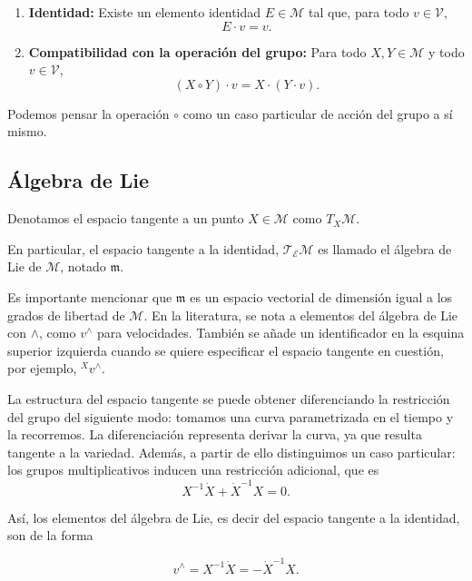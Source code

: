 \begin{enumerate}
\item \textbf{Identidad:}  
Existe un elemento identidad $E \in \mathcal{M}$ tal que, para todo $v \in \mathcal{V}$,
\[
E \cdot v = v.
\]

\item \textbf{Compatibilidad con la operación del grupo:}  
Para todo $X, Y \in \mathcal{M}$ y todo $v \in \mathcal{V}$,
\[
(X \circ Y) \cdot v
=
X \cdot (Y \cdot v).
\]
\end{enumerate}

Podemos pensar la operación $\circ$ como un caso particular de acción del grupo a sí mismo.



\subsection{Álgebra de Lie}

Denotamos el espacio tangente a un punto $X \in \mathcal{M}$ como $T_{X} \mathcal{M}$.

En particular, el espacio tangente a la identidad, $\mathcal{T_E M}$ es llamado el álgebra de Lie de $\mathcal{M}$, notado $\mathfrak{m}$.

Es importante mencionar que $\mathfrak{m}$ es un espacio vectorial de dimensión igual a los grados de libertad de $\mathcal{M}$. En la literatura, se nota a elementos del álgebra de Lie con $\wedge$, como $v^\wedge$ para velocidades. También se añade un identificador en la esquina superior izquierda cuando se quiere especificar el espacio tangente en cuestión, por ejemplo, $^{X}v^\wedge$. 

La estructura del espacio tangente se puede obtener diferenciando la restricción del grupo del siguiente modo: tomamos una curva parametrizada en el tiempo y la recorremos. La diferenciación representa derivar la curva, ya que resulta tangente a la variedad. Además, a partir de ello distinguimos un caso particular: los grupos multiplicativos inducen una restricción adicional, que es 
$$
X^{-1} \dot{X} + \dot{X}^{-1}X = 0.
$$

Así, los elementos del álgebra de Lie, es decir del espacio tangente a la identidad, son de la forma

\begin{equation}
v^{\wedge} = X^{-1} \dot{X} = - \dot{X}^{-1} X.
\label{derivada_algebra_lie}
\end{equation}

